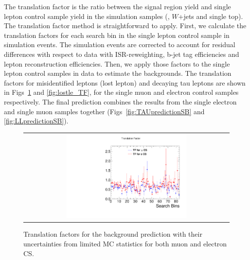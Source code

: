 The translation factor is the ratio between the signal region yield and single lepton control sample yield in the simulation samples (\ttbar, $W$+jets and single top). The translation factor method is straightforward to apply. First, we calculate the translation factors for each search bin in the single lepton control sample in simulation events. The simulation events are corrected to account for residual differences with respect to data with ISR-reweighting, b-jet tag efficiencies and lepton reconstruction efficiencies. Then, we apply those factors to the single lepton control samples in data to estimate the backgrounds. The translation factors for misidentified leptons (lost lepton) and decaying tau leptons are shown in Figs~\ref{fig:hadtau_TF} and \ref{fig:lostle_TF}, for the single muon and electron control samples respectively. The final prediction combines the results from the single electron and single muon samples together (Figs~\ref{fig:TAUpredictionSB} and \ref{fig:LLpredictionSB}). 

\begin{figure}[htbp]
  \begin{center}
  \begin{tabular}{c}
  \includegraphics[angle=0,width=0.60\textwidth]{sections/mc4/Backgrounds/TF/figures/comp_TF_hadtau_comb.pdf}
  \end{tabular}
  \caption{Translation factors for the \tauh background prediction with their uncertainties from limited MC statistics for both muon and electron CS.}
    \label{fig:hadtau_TF}
  \end{center}
\end{figure}



